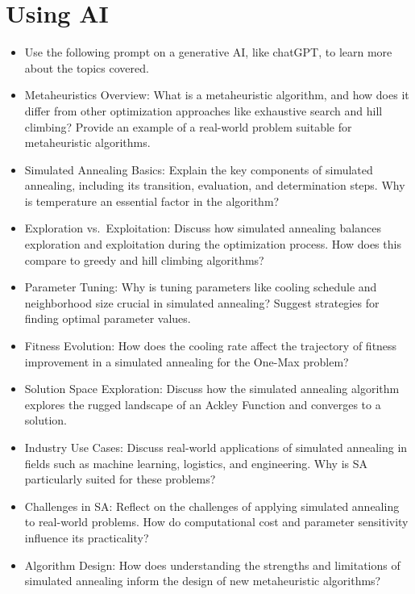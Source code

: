 \documentclass[
  letterpaper,
  DIV=11,
  numbers=noendperiod]{scrreprt}
\providecommand{\tightlist}{%
  \setlength{\itemsep}{0pt}\setlength{\parskip}{0pt}}\usepackage{longtable,booktabs,array}
\begin{document}

\chapter{Using AI}\label{using-ai-6}

\begin{itemize}
\tightlist
\item
  Use the following prompt on a generative AI, like chatGPT, to learn
  more about the topics covered.
\item
  Metaheuristics Overview: What is a metaheuristic algorithm, and how
  does it differ from other optimization approaches like exhaustive
  search and hill climbing? Provide an example of a real-world problem
  suitable for metaheuristic algorithms.
\item
  Simulated Annealing Basics: Explain the key components of simulated
  annealing, including its transition, evaluation, and determination
  steps. Why is temperature an essential factor in the algorithm?
\item
  Exploration vs.~Exploitation: Discuss how simulated annealing balances
  exploration and exploitation during the optimization process. How does
  this compare to greedy and hill climbing algorithms?
\item
  Parameter Tuning: Why is tuning parameters like cooling schedule and
  neighborhood size crucial in simulated annealing? Suggest strategies
  for finding optimal parameter values.
\item
  Fitness Evolution: How does the cooling rate affect the trajectory of
  fitness improvement in a simulated annealing for the One-Max problem?
\item
  Solution Space Exploration: Discuss how the simulated annealing
  algorithm explores the rugged landscape of an Ackley Function and
  converges to a solution.
\item
  Industry Use Cases: Discuss real-world applications of simulated
  annealing in fields such as machine learning, logistics, and
  engineering. Why is SA particularly suited for these problems?
\item
  Challenges in SA: Reflect on the challenges of applying simulated
  annealing to real-world problems. How do computational cost and
  parameter sensitivity influence its practicality?
\item
  Algorithm Design: How does understanding the strengths and limitations
  of simulated annealing inform the design of new metaheuristic
  algorithms?
\end{itemize}
\end{document}
